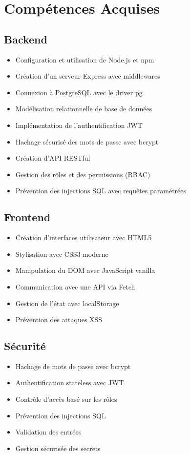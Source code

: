 \section{Compétences Acquises}

\subsection{Backend}

\begin{itemize}
    \item Configuration et utilisation de Node.js et npm
    \item Création d'un serveur Express avec middlewares
    \item Connexion à PostgreSQL avec le driver pg
    \item Modélisation relationnelle de base de données
    \item Implémentation de l'authentification JWT
    \item Hachage sécurisé des mots de passe avec bcrypt
    \item Création d'API RESTful
    \item Gestion des rôles et des permissions (RBAC)
    \item Prévention des injections SQL avec requêtes paramétrées
\end{itemize}

\subsection{Frontend}

\begin{itemize}
    \item Création d'interfaces utilisateur avec HTML5
    \item Stylisation avec CSS3 moderne
    \item Manipulation du DOM avec JavaScript vanilla
    \item Communication avec une API via Fetch
    \item Gestion de l'état avec localStorage
    \item Prévention des attaques XSS
\end{itemize}

\subsection{Sécurité}

\begin{itemize}
    \item Hachage de mots de passe avec bcrypt
    \item Authentification stateless avec JWT
    \item Contrôle d'accès basé sur les rôles
    \item Prévention des injections SQL
    \item Validation des entrées
    \item Gestion sécurisée des secrets
\end{itemize}

